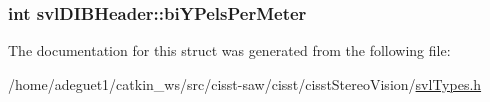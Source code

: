 \hypertarget{structsvl_d_i_b_header_a9a1b75645d1f907fd4ee74041273d48b}{
\subsubsection[{bi\-Y\-Pels\-Per\-Meter}]{\setlength{\rightskip}{0pt plus 5cm}int svl\-D\-I\-B\-Header\-::bi\-Y\-Pels\-Per\-Meter}}\label{structsvl_d_i_b_header_a9a1b75645d1f907fd4ee74041273d48b}


The documentation for this struct was generated from the following file\-:\begin{DoxyCompactItemize}
\item 
/home/adeguet1/catkin\-\_\-ws/src/cisst-\/saw/cisst/cisst\-Stereo\-Vision/\hyperlink{svl_types_8h}{svl\-Types.\-h}\end{DoxyCompactItemize}
